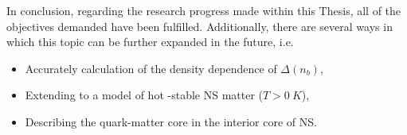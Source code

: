 In conclusion, regarding the research progress made within this Thesis, all of the objectives demanded have been fulfilled. Additionally, there are several ways in which this topic can be further expanded in the future, i.e.
\begin{itemize}
    \item Accurately calculation of the density dependence of $\Delta(n_b)$,
    \item Extending to a model of hot \textbeta-stable \gls{NS} matter ($T>0\:K$),
    \item Describing the quark-matter core in the interior core of \gls{NS}.
\end{itemize}
